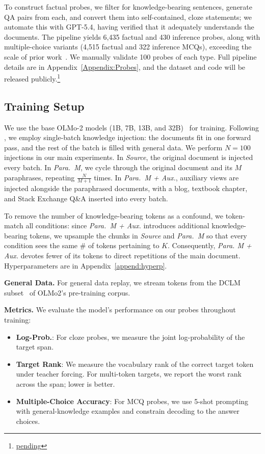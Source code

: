 \documentclass[11pt]{article}
\begin{document}
To construct factual probes, we filter for knowledge-bearing sentences, generate QA pairs from each, and convert them into self-contained, cloze statements; we automate this with GPT-5.4, having verified that it adequately understands the documents. The pipeline yields 6,435 factual and 430 inference probes, along with multiple-choice variants (4,515 factual and 322 inference MCQs), exceeding the scale of prior work~\citep{chang2024large}. We manually validate 100 probes of each type. Full pipeline details are in Appendix~\ref{Appendix:Probes}, and the dataset and code will be released publicly.\footnote{\url{pending}}

\subsection{Training Setup}

We use the base OLMo-2 models (1B, 7B, 13B, and 32B)~\citep{olmo20242} for training. Following \citet{chang2024large}, we employ single-batch knowledge injection: the documents fit in one forward pass, and the rest of the batch is filled with general data. We perform $N=100$ injections in our main experiments. In \textit{Source}, the original document is injected every batch. In \textit{Para.\ M}, we cycle through the original document and its $M$ paraphrases, repeating $\frac{N}{M+1}$ times. In \textit{Para.\ M + Aux.}, auxiliary views are injected alongside the paraphrased documents, with a blog, textbook chapter, and Stack Exchange Q\&A inserted into every batch. 

To remove the number of knowledge-bearing tokens as a confound, we token-match all conditions: since \textit{Para.\ M + Aux.} introduces additional knowledge-bearing tokens, we upsample the chunks in \textit{Source} and \textit{Para.\ M} so that every condition sees the same \# of tokens pertaining to $K$. Consequently, \textit{Para. M + Aux.} devotes fewer of its tokens to direct repetitions of the main document. Hyperparameters are in Appendix~\ref{append:hyperp}.


\textbf{General Data.} For general data replay, we stream tokens from the DCLM subset~\citep{li2024datacomp} of OLMo2's pre-training corpus.

\textbf{Metrics.} We evaluate the model's performance on our probes throughout training:
\begin{itemize}[itemsep=0pt, topsep=0pt, parsep=0pt]
    \item \textbf{Log-Prob.}: For cloze probes, we measure the joint log-probability of the target span.
    \item \textbf{Target Rank}: We measure the vocabulary rank of the correct target token under teacher forcing. For multi-token targets, we report the worst rank across the span; lower is better.
    \item \textbf{Multiple-Choice Accuracy}: For MCQ probes, we use 5-shot prompting with general-knowledge examples and constrain decoding to the answer choices.
\end{itemize}
\end{document}
